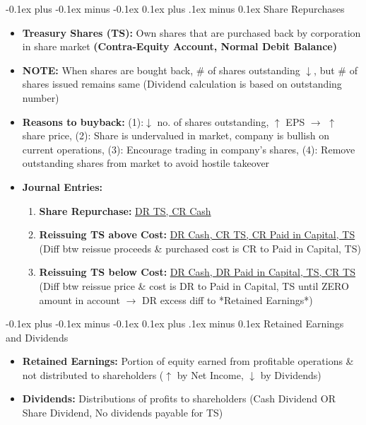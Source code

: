 \documentclass[landscape]{article}
\makeatletter
\renewcommand{\subsection}{\@startsection{subsection}{2}{0mm}%
  {-0.1ex plus -0.1ex minus -0.1ex}%
  {0.1ex plus .1ex minus 0.1ex}%
{\normalfont\scriptsize\bfseries}}
\makeatother
\begin{document}
\begin{multicols}{6}
    \subsection{Share Repurchases}
    \begin{itemize}
      \item \textbf{Treasury Shares (TS):} Own shares that are purchased back by corporation in share market \textbf{(Contra-Equity Account, Normal Debit Balance)}
      \item \textbf{NOTE:} When shares are bought back, \# of shares outstanding $\downarrow$, but \# of shares issued remains same (Dividend calculation is based on outstanding number)
      \item \textbf{Reasons to buyback:} (1):$\downarrow$ no. of shares outstanding, $\uparrow$ EPS $\rightarrow$ $\uparrow$ share price, (2): Share is undervalued in market, company is bullish on current operations, (3): Encourage trading in company's shares, (4): Remove outstanding shares from market to avoid hostile takeover
      \item \textbf{Journal Entries:}
      \begin{enumerate}
        \item \textbf{Share Repurchase:} \underline{DR TS, CR Cash}
        \item \textbf{Reissuing TS above Cost:} \underline{DR Cash, CR TS, CR Paid in Capital, TS} (Diff btw reissue proceeds \& purchased cost is CR to Paid in Capital, TS)
        \item \textbf{Reissuing TS below Cost:} \underline{DR Cash, DR Paid in Capital, TS, CR TS} (Diff btw reissue price \& cost is DR to Paid in Capital, TS until ZERO amount in account $\rightarrow$ DR excess diff to *Retained Earnings*)
      \end{enumerate}
    \end{itemize}
    
    \subsection{Retained Earnings and Dividends}
    \begin{itemize}
      \item \textbf{Retained Earnings:} Portion of equity earned from profitable operations \& not distributed to shareholders ($\uparrow$ by Net Income, $\downarrow$ by Dividends)
      \item \textbf{Dividends:} Distributions of profits to shareholders (Cash Dividend OR Share Dividend, No dividends payable for TS)
    \end{itemize}

\end{multicols}
\end{document}
